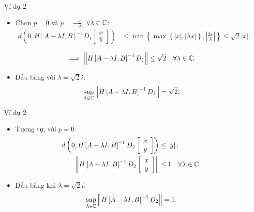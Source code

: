 \begin{frame}{Ví dụ 2}
\begin{itemize}
    \item Chọn $p=0$ và $p=-\frac{x}{\lambda}$, $\forall\lambda\in\mathbb{C}$:
    \begin{align}
        d\left(0,H\left[A-\lambda I,B\right]^{-1}D_{1}\left[\begin{array}{c}
        x\\
        y
        \end{array}\right]\right) & \le\min\left\{ \max\left\{ \left|x\right|,\left|\lambda x\right|\right\} ,\left|\frac{2x}{\lambda}\right|\right\} \le\sqrt{2}\left|x\right|.
    \end{align}
    
    \begin{align}
        \implies\left\lVert H\left[A-\lambda I,B\right]^{-1}D_{1}\right\rVert\le\sqrt{2}\quad\forall\lambda\in\mathbb{C}.
    \end{align}
    \item Dấu bằng với $\lambda=\sqrt{2}i$:
    \begin{align}
        \sup_{\lambda\in\mathbb{C}}\left\lVert H\left[A-\lambda I,B\right]^{-1}D_{1}\right\rVert=\sqrt{2}.
    \end{align}
\end{itemize}
\end{frame}

\begin{frame}{Ví dụ 2}
\begin{itemize}
    \item Tương tự, với $p=0$:
    \begin{align}
        d\left(0,H\left[A-\lambda I,B\right]^{-1}D_{2}\left[\begin{array}{c}
        x\\
        y
        \end{array}\right]\right) & \le\left|y\right|,\\
        \left\lVert H\left[A-\lambda I,B\right]^{-1}D_{2}\left[\begin{array}{c}
        x\\
        y
        \end{array}\right]\right\rVert & \le1\quad\forall\lambda\in\mathbb{C}.
    \end{align}
    \item Dấu bằng khi $\lambda=\sqrt{2}i$:
    \begin{align}
        \sup_{\lambda\in\mathbb{C}}\left\lVert H\left[A-\lambda I,B\right]^{-1}D_{2}\right\rVert=1.
    \end{align}
\end{itemize}
\end{frame}

